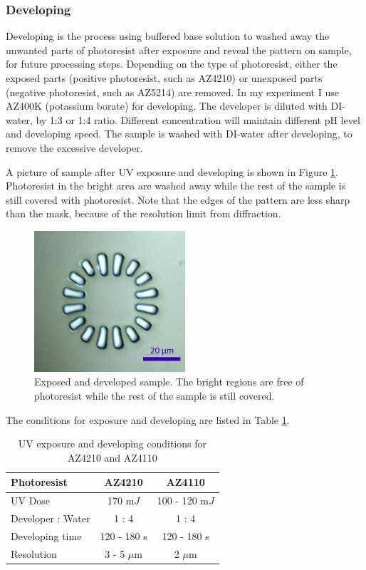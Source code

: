 \documentclass[pdflatex, sectionletters, 12pt]{pittetd}    %
\begin{document}
\subsubsection{Developing}

Developing is the process using buffered base solution to washed away the unwanted parts of photoresist after exposure and reveal the pattern on sample, for future processing steps. Depending on the type of photoresist, either the exposed parts (positive photoresist, such as AZ4210) or unexposed parts (negative photoresist, such as AZ5214) are removed. In my experiment I use AZ400K (potassium borate) for developing. The developer is diluted with DI-water, by 1:3 or 1:4 ratio. Different concentration will maintain different pH level and developing speed. The sample is washed with DI-water after developing, to remove the excessive developer. 

A picture of sample after UV exposure and developing is shown in Figure \ref{FIG:Developed}. Photoresist in the bright area are washed away while the rest of the sample is still covered with photoresist. Note that the edges of the pattern are less sharp than the mask, because of the resolution limit from diffraction. 
\\
\begin{figure}[h!]
	\centering
	\includegraphics[width=0.5\textwidth]{Drawing/Developed.png}
	\caption{Exposed and developed sample. The bright regions are free of photoresist while the rest of the sample is still covered.}
	\label{FIG:Developed}
\end{figure}

The conditions for exposure and developing are listed in Table \ref{tab:photoresistsExposureDeveloping}.

\begin{table}[h!]
	\centering
	\begin{tabular}{l|cc}
		\hline
		Photoresist	&	AZ4210	&	AZ4110 \\ \hline
		UV Dose	&	170 m$J$	& 100 - 120 m$J$	\\ 
		Developer : Water	&	1 : 4	&	1 : 4	\\
		Developing time	&	120 - 180 s	&	120 - 180 s \\ 
		Resolution	&	3 - 5 $\mu$m	&	2 $\mu$m	\\ \hline
	\end{tabular}
	\caption{UV exposure and developing conditions for AZ4210 and AZ4110}
	\label{tab:photoresistsExposureDeveloping}
	
\end{table}
\end{document}
